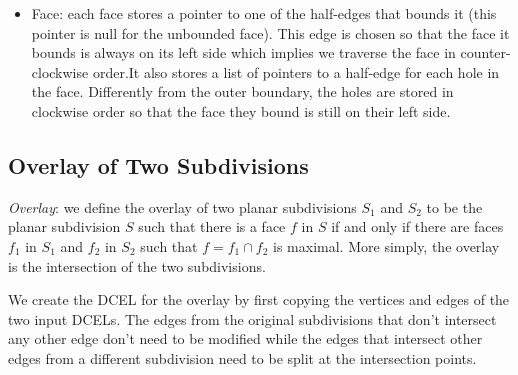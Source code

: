 \begin{itemize}
    \item Face: each face stores a pointer to one of the half-edges that bounds it (this pointer is null for the unbounded face). This edge is chosen so that the face it bounds is always on its left side which implies we traverse the face in counter-clockwise order.It also stores a list of pointers to a half-edge for each hole in the face. Differently from the outer boundary, the holes are stored in clockwise order so that the face they bound is still on their left side.
\end{itemize}

\subsection{Overlay of Two Subdivisions}
\label{sec:overlay}
\noindent \textit{Overlay}: we define the overlay of two planar subdivisions $S_1$ and $S_2$ to be the planar subdivision $S$ such that there is a face $f$ in $S$ if and only if there are faces $f_1$ in $S_1$ and $f_2$ in $S_2$ such that $f = f_1 \cap f_2$ is maximal. More simply, the overlay is the intersection of the two subdivisions.

We create the DCEL for the overlay by first copying the vertices and edges of the two input DCELs. The edges from the original subdivisions that don't intersect any other edge don't need to be modified while the edges that intersect other edges from a different subdivision need to be split at the intersection points.

